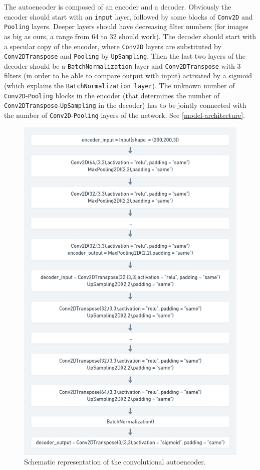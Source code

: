 \documentclass[aps,twocolumn,secnumarabic,nobalancelastpage,amsmath,amssymb,
nofootinbib]{revtex4}
\begin{document}
The autoencoder is composed of an encoder and a decoder. Obviously the
encoder should start with an \texttt{input} layer, followed by some
blocks of \texttt{Conv2D} and \texttt{Pooling} layers. Deeper layers
should have decreasing filter numbers (for images as big as ours, a
range from 64 to 32 should work). The decoder should start with a
specular copy of the encoder, where \texttt{Conv2D} layers are
substituted by \texttt{Conv2DTranspose} and \texttt{Pooling} by
\texttt{UpSampling}. Then the last two layers of the decoder should be a \texttt{BatchNormalization} layer and \texttt{Conv2DTranspose} with 3
filters (in order to be able to compare output with input) activated by
a sigmoid (which explains the \texttt{BatchNormalization\ layer}). The
unknown number of \texttt{Conv2D}-\texttt{Pooling} blocks in the encoder (that determines the number of \texttt{Conv2DTranspose}-\texttt{UpSampling} in the decoder) has to be
jointly connected with the number of \texttt{Conv2D}-\texttt{Pooling}
layers of the network. See \ref{model-architecture}.

\begin{figure}
	\centering
	\includegraphics[width=0.7\linewidth]{Images/AEShort}
	\caption{Schematic representation of the convolutional autoencoder.}\label{fig:ae}
\end{figure}
\end{document}
